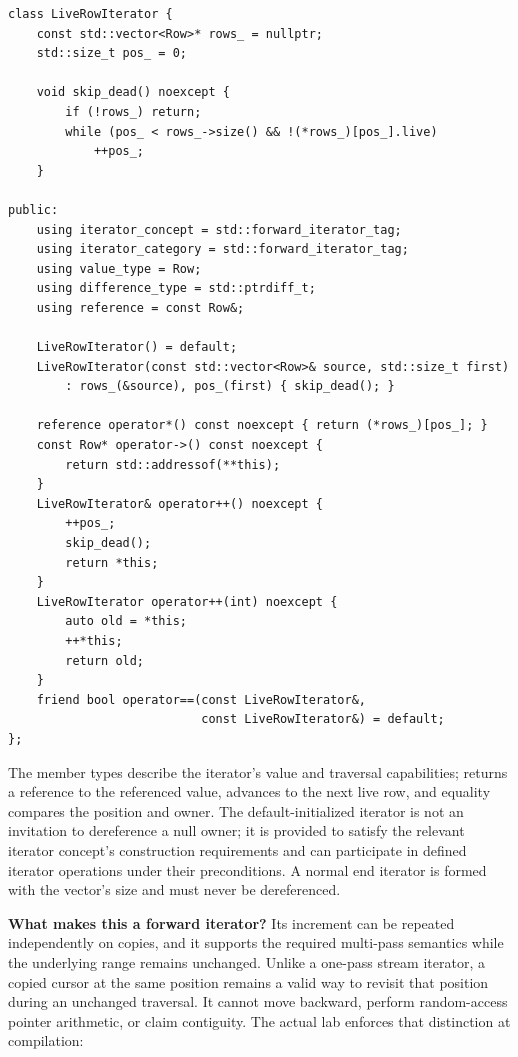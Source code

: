 \begin{verbatim}
class LiveRowIterator {
    const std::vector<Row>* rows_ = nullptr;
    std::size_t pos_ = 0;

    void skip_dead() noexcept {
        if (!rows_) return;
        while (pos_ < rows_->size() && !(*rows_)[pos_].live)
            ++pos_;
    }

public:
    using iterator_concept = std::forward_iterator_tag;
    using iterator_category = std::forward_iterator_tag;
    using value_type = Row;
    using difference_type = std::ptrdiff_t;
    using reference = const Row&;

    LiveRowIterator() = default;
    LiveRowIterator(const std::vector<Row>& source, std::size_t first)
        : rows_(&source), pos_(first) { skip_dead(); }

    reference operator*() const noexcept { return (*rows_)[pos_]; }
    const Row* operator->() const noexcept {
        return std::addressof(**this);
    }
    LiveRowIterator& operator++() noexcept {
        ++pos_;
        skip_dead();
        return *this;
    }
    LiveRowIterator operator++(int) noexcept {
        auto old = *this;
        ++*this;
        return old;
    }
    friend bool operator==(const LiveRowIterator&,
                           const LiveRowIterator&) = default;
};
\end{verbatim}

The member types describe the iterator's value and traversal capabilities;  returns a reference to the referenced value,  advances to the next live row, and equality compares the position and owner. The default-initialized iterator is not an invitation to dereference a null owner; it is provided to satisfy the relevant iterator concept's construction requirements and can participate in defined iterator operations under their preconditions. A normal end iterator is formed with the vector's size and must never be dereferenced.

\textbf{What makes this a forward iterator?} Its increment can be repeated independently on copies, and it supports the required multi-pass semantics while the underlying range remains unchanged. Unlike a one-pass stream iterator, a copied cursor at the same position remains a valid way to revisit that position during an unchanged traversal. It cannot move backward, perform random-access pointer arithmetic, or claim contiguity. The actual lab enforces that distinction at compilation:

